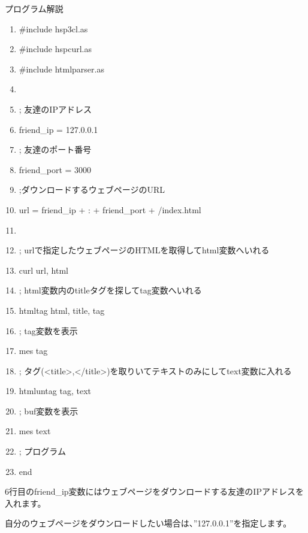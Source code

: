 \clearpage
\noindent プログラム解説
\begin{center}
\begin{boxedminipage}{16.053cm}
\setlength{\itemsep}{0cm} %
\setlength{\parskip}{0cm} %
\begin{enumerate}
\baselineskip 10pt
\setlength{\itemsep}{0cm} %
\item \#include {\textquotedbl}hsp3cl.as{\textquotedbl}
\item \#include {\textquotedbl}hspcurl.as{\textquotedbl}
\item \#include {\textquotedbl}htmlparser.as{\textquotedbl}
\item
\item ; 友達のIPアドレス
\item friend\_ip = {\textquotedbl}127.0.0.1{\textquotedbl}
\item ; 友達のポート番号
\item friend\_port = 3000
\item ;ダウンロードするウェブページのURL
\item url = friend\_ip + {\textquotedbl}:{\textquotedbl} + friend\_port + {\textquotedbl}/index.html{\textquotedbl}
\item
\item ;
urlで指定したウェブページのHTMLを取得してhtml変数へいれる
\item curl url, html
\item ;
html変数内のtitleタグを探してtag変数へいれる
\item htmltag html, {\textquotedbl}title{\textquotedbl}, tag
\item ; tag変数を表示
\item mes tag
\item ;
タグ({\textless}title{\textgreater},{\textless}/title{\textgreater})を取りいてテキストのみにしてtext変数に入れる
\item htmluntag tag, text
\item ; buf変数を表示
\item mes text
\item ; プログラム
\item end
\end{enumerate}
\end{boxedminipage}
\end{center}

6行目のfriend\_ip変数にはウェブページをダウンロードする友達のIPアドレスを入れます。

自分のウェブページをダウンロードしたい場合は、”127.0.0.1”を指定します。

